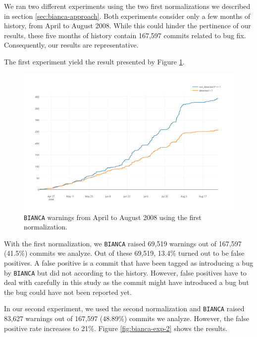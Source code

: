 We ran two different experiments using the two first normalizations we described in section \ref{sec:bianca-approach}. Both experiments consider only a few months of history, from April to August 2008. While this could hinder the pertinence of our results, these five months of history contain 167,597 commits related to bug fix. Consequently, our results are representative.

The first experiment yield the result presented by Figure \ref{fig:bianca-exp-1}.

\begin{figure}[h!]
  \centering
    \includegraphics[scale=0.55]{media/bianca-13.png}
    \caption{{\tt BIANCA} warnings from April to August 2008 using the first normalization.
    \label{fig:bianca-exp-1}}
\end{figure}

With the first normalization, we {\tt BIANCA} raised 69,519 warnings out of 167,597 (41.5\%) commits we analyze. Out of these 69,519, 13.4\% turned out to be false positives. A false positive is a commit that have been tagged as introducing a bug by {\tt BIANCA} but did not according to the history. However, false positives have to deal with carefully in this study as the commit might have introduced a bug but the bug could have not been reported yet.

In our second experiment, we used the second normalization and {\tt BIANCA} raised 83,627 warnings out of 167,597 (48.89\%) commits we analyze. However, the false positive rate increases to 21\%. Figure \ref{fig:bianca-exp-2} shows the results.

